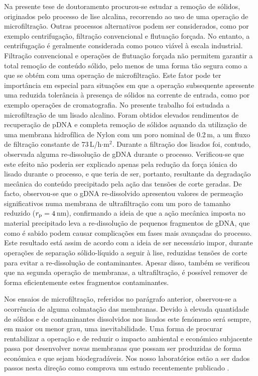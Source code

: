 Na presente tese de doutoramento procurou-se estudar a remoção de sólidos, originados pelo processo de lise alcalina, recorrendo ao uso de uma operação de microfiltração. Outras processos alternativos podem ser considerados, como por exemplo centrifugação, filtração convencional e flutuação forçada. No entanto, a centrifugação é geralmente considerada como pouco viável à escala industrial. Filtração convencional e operações de flutuação forçada não permitem garantir a total remoção de conteúdo sólido, pelo menos de uma forma tão segura como a que se obtém com uma operação de microfiltração. Este fator pode ter importância em especial para situações em que a operação subsequente apresente uma reduzida tolerância à presença de sólidos na corrente de entrada, como por exemplo operações de cromatografia. No presente trabalho foi estudada a microfiltração de um lisado alcalino. Foram obtidos elevados rendimentos de recuperação de pDNA e completa remoção de sólidos aquando da utilização de uma membrana hidrofílica de Nylon com um poro nominal de 0.2\,\micro m, a um fluxo de filtração constante de 73\,L/h$\cdot$m$^2$. Durante a filtração dos lisados foi, contudo, observada alguma re-dissolução de gDNA durante o processo. Verificou-se que este efeito não poderia ser explicado apenas pela redução da força iónica do lisado durante o processo, e que teria de ser, portanto, resultante da degradação mecânica do conteúdo precipitado pela ação das tensões de corte geradas. De facto, observou-se que o gDNA re-dissolvido apresentou valores de permeação significativos numa membrana de ultrafiltração com um poro de tamanho reduzido ($r_{\mathrm{p}} = 4$\,nm), confirmando a ideia de que a ação mecânica imposta no material precipitado leva a re-dissolução de pequenos fragmentos de gDNA, que como é sabido podem causar complicações em fases mais avançadas do processo. Este resultado está assim de acordo com a ideia de ser necessário impor, durante operações de separação sólido-líquido a seguir à lise, reduzidas tensões de corte para evitar a re-dissolução de contaminantes. Apesar disso, também se verificou que na segunda operação de membranas, a ultrafiltração, é possível remover de forma eficientemente estes fragmentos contaminantes.    

Nos ensaios de microfiltração, referidos no parágrafo anterior, observou-se a ocorrência de alguma colmatação das membranas. Devido à elevada quantidade de sólidos e de contaminantes dissolvidos nos lisados este fenómeno será sempre, em maior ou menor grau, uma inevitabilidade. Uma forma de procurar rentabilizar a operação e de reduzir o impacto ambiental e económico subjacente passa por desenvolver novas membranas que possam ser produzidas de forma económica e que sejam biodegradáveis. Nos nosso laboratórios estão a ser dados passos nesta direção como comprova um estudo recentemente publicado \cite{meues}.  
